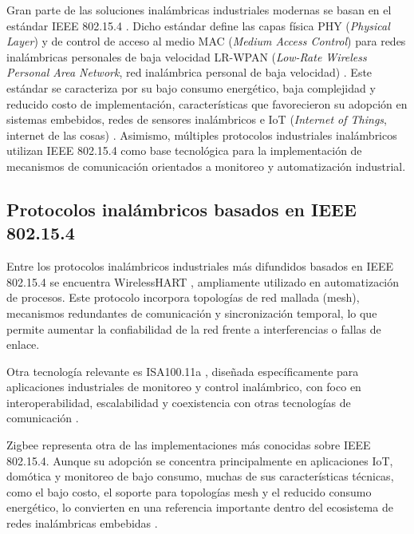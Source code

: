 Gran parte de las soluciones inalámbricas industriales modernas \cite{wirelesshart_official,isa_official,zigbee_official} se basan en el estándar IEEE 802.15.4 \cite{ieee_standard}. Dicho estándar define las capas física PHY (\textit{Physical Layer}) y de control de acceso al medio MAC (\textit{Medium Access Control}) para redes inalámbricas personales de baja velocidad LR-WPAN (\textit{Low-Rate Wireless Personal Area Network}, red inalámbrica personal de baja velocidad) \cite{ieee_standard}. Este estándar se caracteriza por su bajo consumo energético, baja complejidad y reducido costo de implementación, características que favorecieron su adopción en sistemas embebidos, redes de sensores inalámbricos e IoT (\textit{Internet of Things}, internet de las cosas) \cite{overview_embedded_i40}. Asimismo, múltiples protocolos industriales inalámbricos utilizan IEEE 802.15.4 como base tecnológica para la implementación de mecanismos de comunicación orientados a monitoreo y automatización industrial.

\subsection{Protocolos inalámbricos basados en IEEE 802.15.4}

Entre los protocolos inalámbricos industriales más difundidos basados en IEEE 802.15.4 se encuentra WirelessHART \cite{wirelesshart_official}, ampliamente utilizado en automatización de procesos. Este protocolo incorpora topologías de red mallada (mesh), mecanismos redundantes de comunicación y sincronización temporal, lo que permite aumentar la confiabilidad de la red frente a interferencias o fallas de enlace.

Otra tecnología relevante es ISA100.11a \cite{isa_official,review_iwn_industry40}, diseñada específicamente para aplicaciones industriales de monitoreo y control inalámbrico, con foco en interoperabilidad, escalabilidad y coexistencia con otras tecnologías de comunicación \cite{review_iwn_industry40}.

Zigbee \cite{zigbee_official,review_iwn_industry40} representa otra de las implementaciones más conocidas sobre IEEE 802.15.4. Aunque su adopción se concentra principalmente en aplicaciones IoT, domótica y monitoreo de bajo consumo, muchas de sus características técnicas, como el bajo costo, el soporte para topologías mesh y el reducido consumo energético, lo convierten en una referencia importante dentro del ecosistema de redes inalámbricas embebidas \cite{review_iwn_industry40}.

